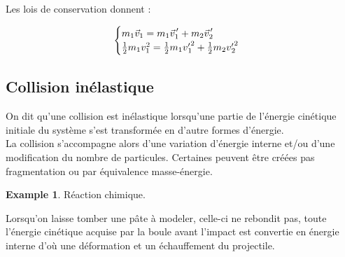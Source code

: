\documentclass[12pt,a4paper,oneside,french]{book}
\newcommand{\pvec}[1]{\vec{#1} \mkern2mu \vphantom{#1}}
\theoremstyle{definition}
\theoremstyle{definition}
\newtheorem*{example}{Example}
\theoremstyle{definition}
\theoremstyle{remark}
\theoremstyle{definition}
\begin{document}
    Les lois de conservation donnent :
    
    \begin{equation*}
    \begin{cases}
        {m}_{1} {\vec{v}}_{1} = {m}_{1} {\pvec{v}}_{\! 1}' + {m}_{2} {\pvec{v}}_{\! 2}' \\
        \frac{1}{2} {m}_{1} {v}_{1}^{2} = \frac{1}{2} {m}_{1} {v'}_{\!\! 1}^{2} + \frac{1}{2} {m}_{2} {v'}_{\!\! 2}^{2}
    \end{cases}
    \end{equation*}
    
    \subsection{Collision inélastique}
    On dit qu'une collision est inélastique lorsqu'une  partie de l'énergie cinétique initiale du système s'est transformée en d'autre formes d'énergie. \\
    
    La collision s'accompagne alors d'une variation d'énergie interne et/ou d'une modification du nombre de particules. Certaines peuvent être créées pas fragmentation ou par équivalence masse-énergie.
    
    \begin{example}
        Réaction chimique.
    \end{example}
    
    Lorsqu'on laisse tomber une pâte à modeler, celle-ci ne rebondit pas, toute l'énergie cinétique acquise par la boule avant l'impact est convertie en énergie interne d'où une déformation et un échauffement du projectile.
    
\end{document}
